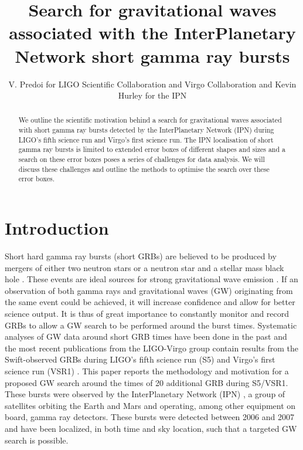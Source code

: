 \documentclass[a4paper]{jpconf}
\begin{document}
\title{Search for gravitational waves associated with the InterPlanetary Network short gamma ray bursts}

\author{V. Predoi for LIGO Scientific Collaboration and Virgo Collaboration and Kevin Hurley for the IPN }

\address{Cardiff University, Physics and Astronomy, The Parade, Cardiff CF24 3AA, UK}


\begin{abstract}
We outline the scientific motivation behind a search for gravitational waves associated with short gamma ray bursts detected by the InterPlanetary Network (IPN) during LIGO's fifth science run and Virgo's first science run. The IPN localisation of short gamma ray bursts is limited to extended error boxes of different shapes and sizes and a search on these error boxes poses a series of challenges for data analysis. We will discuss these challenges and outline the methods to optimise the search over these error boxes.
\end{abstract}

\section{Introduction}

Short hard gamma ray bursts (short GRBs) are believed to be produced by mergers of either two neutron stars or a neutron star and a stellar mass black hole \cite{Nakar:2007, ShibTan06, Berger:2010qx}. These events are ideal sources for strong gravitational wave emission \cite{ACST94, Kiuchi:2010ze}. If an observation of both gamma rays and gravitational waves (GW) originating from the same event could be achieved, it will increase confidence and allow for better science output. It is thus of great importance to constantly monitor and record GRBs to allow a GW search to be performed around the burst times. Systematic analyses of GW data around short GRB times have been done in the past and the most recent publications from the LIGO-Virgo group contain results from the Swift-observed GRBs during LIGO's fifth science run (S5) and Virgo's first science run (VSR1) \cite{Abadie:2010uf, Collaboration:2009kk}. This paper reports the methodology and motivation for a proposed GW search around the times of 20 additional GRB during S5/VSR1. These bursts were observed by the InterPlanetary Network (IPN) \cite{Hurley:2002wv, HurleyHTML}, a group of satellites orbiting the Earth and Mars and operating, among other equipment on board, gamma ray detectors. These bursts were detected between 2006 and 2007 and have been localized, in both time and sky location, such that a targeted GW search is possible.
\end{document}
